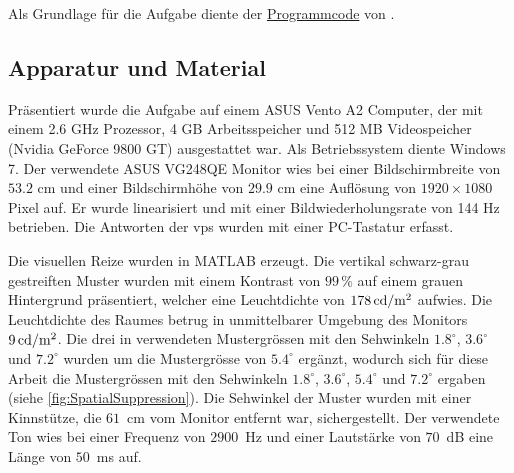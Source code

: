 \documentclass[11pt, twoside, a4paper]{book}		%
\begin{document}
Als Grundlage für die Aufgabe diente der \href{http://www.bcs.rochester.edu/people/duje/SuppressionCode.zip}{Programmcode} von \citet{Melnick2013}.

\subsection{Apparatur und Material \label{sub:ssas}}
Präsentiert wurde die Aufgabe auf einem ASUS Vento A2 Computer, der mit einem 2.6 GHz Prozessor, 4 GB Arbeitsspeicher und 512 MB Videospeicher (Nvidia GeForce 9800 GT) ausgestattet war. Als Betriebssystem diente Windows 7. Der verwendete ASUS VG248QE Monitor wies bei einer Bildschirmbreite von $53.2$ cm und einer Bildschirmhöhe von $29.9$ cm eine Auflösung von $1920 \times 1080$ Pixel auf. Er wurde linearisiert und mit einer Bildwiederholungsrate von 144 Hz betrieben. Die Antworten der \glspl{vp} wurden mit einer PC-Tastatur erfasst. 

Die visuellen Reize wurden in MATLAB\textsuperscript{\textregistered} \citep{matlab} erzeugt. Die vertikal schwarz-grau gestreiften Muster wurden mit einem Kontrast von $99\,\%$ auf einem grauen Hintergrund präsentiert, welcher eine Leuchtdichte von $178\,\textnormal{cd}/ \textnormal{m}^2$ aufwies. Die Leuchtdichte des Raumes betrug in unmittelbarer Umgebung des Monitors $9\,\textnormal{cd}/ \textnormal{m}^2$. Die drei in \citet{Melnick2013} verwendeten Mustergrössen mit den Sehwinkeln  $1.8^{\circ}$, $3.6^{\circ}$ und $7.2^{\circ}$ wurden um die Mustergrösse von $5.4^{\circ}$ ergänzt, wodurch sich für diese Arbeit die Mustergrössen mit den Sehwinkeln $1.8^{\circ}$, $3.6^{\circ}$, $5.4^{\circ}$ und $7.2^{\circ}$ ergaben (siehe \autoref{fig:SpatialSuppression}). 
Die Sehwinkel der Muster wurden mit einer Kinnstütze, die $61$~cm vom Monitor entfernt war, sichergestellt. Der verwendete Ton wies bei einer Frequenz von $2900$~Hz und einer Lautstärke von $70$~dB eine Länge von $50$~ms auf.

%
%
\end{document}
